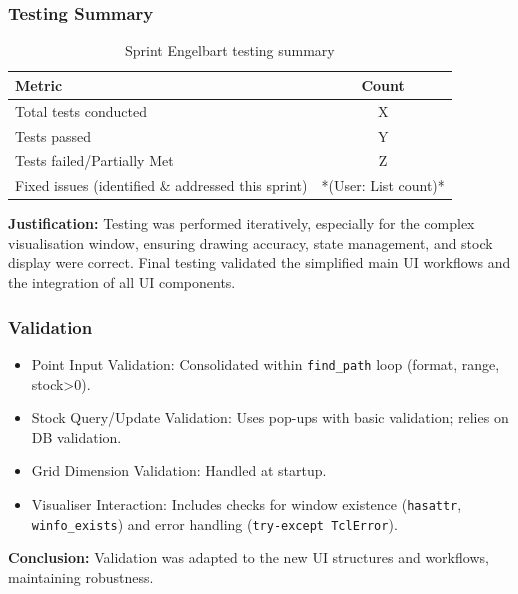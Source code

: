 \newpage

\subsubsection{Testing Summary}

\begin{table}[htbp!]
	\centering
	\begin{tabular}{|l|c|}
		\hline
		\textbf{Metric} & \textbf{Count} \\
		\hline
		Total tests conducted & X \\ %
		\hline
		Tests passed & Y \\
		\hline
		Tests failed/Partially Met & Z \\
		\hline
		Fixed issues (identified \& addressed this sprint) & *(User: List count)* \\
		\hline
	\end{tabular}
	\caption{Sprint Engelbart testing summary}
\end{table}
\textbf{Justification:} Testing was performed iteratively, especially for the complex visualisation window, ensuring drawing accuracy, state management, and stock display were correct. Final testing validated the simplified main UI workflows and the integration of all UI components.

\subsubsection{Validation}
\begin{itemize}
	\item Point Input Validation: Consolidated within \verb|find_path| loop (format, range, stock>0).
	\item Stock Query/Update Validation: Uses pop-ups with basic validation; relies on DB validation.
	\item Grid Dimension Validation: Handled at startup.
	\item Visualiser Interaction: Includes checks for window existence (\verb|hasattr|, \verb|winfo_exists|) and error handling (\verb|try-except TclError|).
\end{itemize}
\textbf{Conclusion:} Validation was adapted to the new UI structures and workflows, maintaining robustness.

